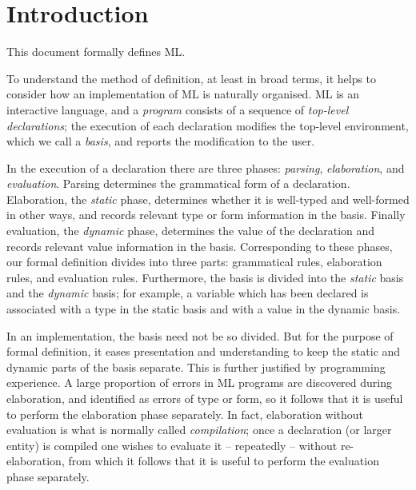%
\section{Introduction}

This document formally defines  ML.

To understand the method of definition, at least in broad terms, it helps to
consider how an implementation of ML is naturally
organised.  ML is an interactive
language,
and a {\sl program}  consists of a sequence of {\sl top-level
declarations}; the execution
of each declaration modifies the top-level environment, which we call
a {\sl basis}, and reports the modification to the user.

In the execution of a declaration there are three phases:
{\sl parsing}, {\sl elaboration}, and {\sl evaluation}.
Parsing
determines the grammatical form of a declaration.  Elaboration, the
{\sl static} phase, determines whether it is well-typed and
well-formed in other ways, and records relevant type or form information
in the basis. Finally evaluation, the {\sl dynamic} phase, determines the
value of the declaration and records relevant value information in the
basis.  Corresponding to these phases, our formal definition divides
into three parts:  grammatical rules, elaboration rules, and evaluation
rules.  Furthermore, the basis is divided into the {\sl static}
basis and the {\sl dynamic} basis; for example, a variable which has been
declared is associated with a type in the static basis and with a value in
the dynamic basis.

In an implementation, the basis need not be so divided.  But for the
purpose of formal definition, it eases presentation and understanding to
keep the static and dynamic parts of the basis separate.
This is further justified by programming experience.  A large proportion
of errors in ML programs are discovered during elaboration, and identified
as errors of type or form, so it follows that it is useful to perform
the elaboration phase separately.  In fact, elaboration without
evaluation is  what is normally called {\sl compilation};
once
a declaration (or larger entity) is compiled one wishes to evaluate it --
repeatedly -- without re-elaboration, from which it follows that it is
useful to perform the evaluation phase separately.


